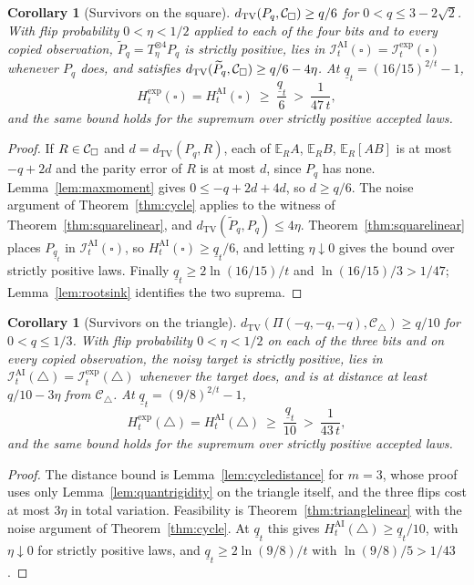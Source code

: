 \documentclass[11pt]{article}
\theoremstyle{plain}
\newtheorem{corollary}[theorem]{Corollary}
\theoremstyle{definition}
\DeclareMathOperator{\TV}{TV}
\newcommand{\Ctri}{\mathcal C_{\triangle}}
\newcommand{\IAI}{\mathcal I^{\mathrm{AI}}}
\newcommand{\Iexp}{\mathcal I^{\mathrm{exp}}}
\newcommand{\E}{\mathbb E}
\begin{document}
\begin{corollary}[Survivors on the square]\label{cor:squaredistance}
$d_{\TV}(P_q,\Csq)\ge q/6$ for $0<q\le3-2\sqrt2$. With flip probability $0<\eta<1/2$ applied to each of the four bits and to every copied observation, $\widetilde P_q=T_\eta^{\otimes4}P_q$ is strictly positive, lies in $\IAI_t(\square)=\Iexp_t(\square)$ whenever $P_q$ does, and satisfies $d_{\TV}(\widetilde P_q,\Csq)\ge q/6-4\eta$. At $\underline q_t=(16/15)^{2/t}-1$,
\[
H^{\mathrm{exp}}_t(\square)=H^{\mathrm{AI}}_t(\square)\ \ge\ \frac{\underline q_t}6\ >\ \frac1{47\,t},
\]
and the same bound holds for the supremum over strictly positive accepted laws.
\end{corollary}

\begin{proof}
If $R\in\mathcal C_{\square}$ and $d=d_{\TV}(P_q,R)$, each of $\E_RA$, $\E_RB$, $\E_R[AB]$ is at most $-q+2d$ and the parity error of $R$ is at most $d$, since $P_q$ has none. Lemma~\ref{lem:maxmoment} gives $0\le-q+2d+4d$, so $d\ge q/6$. The noise argument of Theorem~\ref{thm:cycle} applies to the witness of Theorem~\ref{thm:squarelinear}, and $d_{\TV}(\widetilde P_q,P_q)\le4\eta$. Theorem~\ref{thm:squarelinear} places $P_{\underline q_t}$ in $\IAI_t(\square)$, so $H^{\mathrm{AI}}_t(\square)\ge \underline q_t/6$, and letting $\eta\downarrow0$ gives the bound over strictly positive laws. Finally $\underline q_t\ge2\ln(16/15)/t$ and $\ln(16/15)/3>1/47$; Lemma~\ref{lem:rootsink} identifies the two suprema.
\end{proof}

\begin{corollary}[Survivors on the triangle]\label{cor:triangledistance}
$d_{\TV}(\Pi(-q,-q,-q),\Ctri)\ge q/10$ for $0<q\le1/3$. With flip probability $0<\eta<1/2$ on each of the three bits and on every copied observation, the noisy target is strictly positive, lies in $\IAI_t(\triangle)=\Iexp_t(\triangle)$ whenever the target does, and is at distance at least $q/10-3\eta$ from $\Ctri$. At $\underline q_t=(9/8)^{2/t}-1$,
\[
H^{\mathrm{exp}}_t(\triangle)=H^{\mathrm{AI}}_t(\triangle)\ \ge\ \frac{\underline q_t}{10}\ >\ \frac1{43\,t},
\]
and the same bound holds for the supremum over strictly positive accepted laws.
\end{corollary}

\begin{proof}
The distance bound is Lemma~\ref{lem:cycledistance} for $m=3$, whose proof uses only Lemma~\ref{lem:quantrigidity} on the triangle itself, and the three flips cost at most $3\eta$ in total variation. Feasibility is Theorem~\ref{thm:trianglelinear} with the noise argument of Theorem~\ref{thm:cycle}. At $\underline q_t$ this gives $H^{\mathrm{AI}}_t(\triangle)\ge \underline q_t/10$, with $\eta\downarrow0$ for strictly positive laws, and $\underline q_t\ge2\ln(9/8)/t$ with $\ln(9/8)/5>1/43$.
\end{proof}
\end{document}
